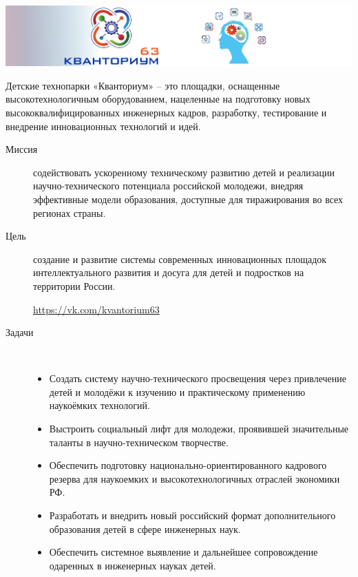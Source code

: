 \noindent\includegraphics[width=\textwidth]{img/logo63.png}


\noindent
Детские технопарки «Кванториум» – это площадки, оснащенные высокотехнологичным
оборудованием, нацеленные на подготовку новых высококвалифицированных инженерных
кадров, разработку, тестирование и внедрение инновационных технологий и идей.

\clearpage

\begin{description}

\item[Миссия] содействовать ускоренному техническому развитию детей и реализации
научно-технического потенциала российской молодежи, внедряя эффективные модели
образования, доступные для тиражирования во всех регионах страны.

\item[Цель] создание и развитие системы современных инновационных площадок
интеллектуального развития и досуга для детей и подростков на территории России.

\bigskip
\url{https://vk.com/kvantorium63}

\clearpage
\item[Задачи]\ \\

\begin{itemize}[nosep]
  \item 
Создать систему научно-технического просвещения через привлечение детей и
молодёжи к изучению и практическому применению наукоёмких технологий.
  \item 
Выстроить социальный лифт для молодежи, проявившей значительные таланты в
научно-техническом творчестве.
  \item 
Обеспечить подготовку национально-ориентированного кадрового резерва для
наукоемких и высокотехнологичных отраслей экономики РФ.
  \item 
Разработать и внедрить новый российский формат дополнительного образования детей
в сфере инженерных наук.
  \item 
Обеспечить системное выявление и дальнейшее сопровождение одаренных в инженерных
науках детей.
\end{itemize}
 
\end{description}

